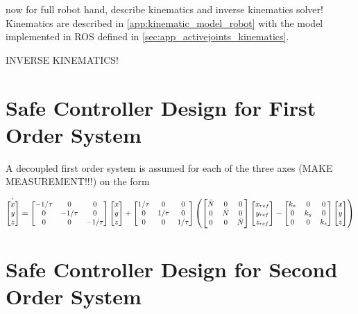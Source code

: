 now for full robot hand, describe kinematics and inverse kinematics solver!
Kinematics are described in \autoref{app:kinematic_model_robot} with the model implemented in ROS defined in \autoref{sec:app_activejoints_kinematics}.

INVERSE KINEMATICS!

\section{Safe Controller Design for First Order System}

A decoupled first order system is assumed for each of the three axes (MAKE MEASUREMENT!!!) on the form

\begin{equation}
\small
\dot{\begin{bmatrix}
	x\\y\\z
	\end{bmatrix}} =
\begin{bmatrix}
-1/\tau & 0 & 0\\0 & -1/\tau & 0 \\ 0 & 0 & -1/\tau
\end{bmatrix}
\begin{bmatrix}
x\\y\\z
\end{bmatrix} +
\begin{bmatrix}
1/\tau& 0 & 0 \\ 0& 1/\tau & 0 \\0& 0& 1/\tau
\end{bmatrix} 
\left(
\begin{bmatrix}
\bar{N} & 0 & 0 \\0 & \bar{N} & 0 \\0& 0& \bar{N}
\end{bmatrix}
\begin{bmatrix}
x_{ref}\\y_{ref}\\z_{ref}
\end{bmatrix}
-
\begin{bmatrix}
k_x & 0 & 0 \\0 & k_y & 0 \\0& 0&  k_z
\end{bmatrix}
\begin{bmatrix}
x\\y\\z
\end{bmatrix}
\right)
\end{equation}

\section{Safe Controller Design for Second Order System}